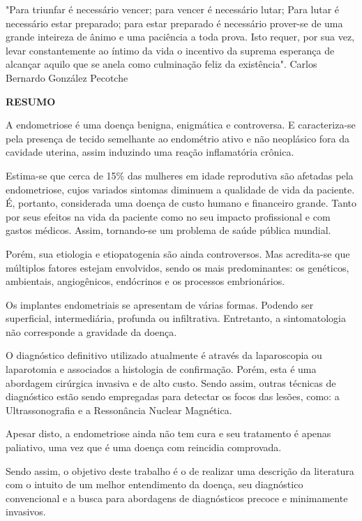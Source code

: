 \documentclass[12pt]{article} %
\begin{document}
"Para triunfar é necessário vencer; para vencer é necessário lutar;
Para lutar é necessário estar preparado; para estar preparado é necessário prover-se de uma grande inteireza de ânimo e uma paciência a toda prova. Isto requer, por sua vez, levar constantemente ao íntimo da vida o incentivo da suprema esperança de alcançar aquilo que se anela como culminação feliz da existência".
Carlos Bernardo González Pecotche 




\newpage
\begin{center}
\MakeUppercase{\textbf{Resumo}}
\end{center}

A endometriose é uma doença benigna, enigmática e controversa. E
caracteriza-se pela presença de tecido semelhante ao endométrio ativo
e não neoplásico fora da cavidade uterina, assim induzindo uma reação
inflamatória crônica.

Estima-se que cerca de 15\% das mulheres em idade reprodutiva são
afetadas pela endometriose, cujos variados sintomas diminuem a
qualidade de vida da paciente. É, portanto, considerada uma doença de
custo humano e financeiro grande.  Tanto por seus efeitos na vida da
paciente como no seu impacto profissional e com gastos médicos.
Assim, tornando-se um problema de saúde pública mundial.

Porém, sua etiologia e etiopatogenia são ainda controversos. Mas
acredita-se que múltiplos fatores estejam envolvidos, sendo os mais
predominantes: os genéticos, ambientais, angiogênicos, endócrinos e
os processos embrionários.

Os implantes endometriais se apresentam de várias formas. Podendo ser
superficial, intermediária, profunda ou infiltrativa. Entretanto, a
sintomatologia não corresponde a gravidade da doença. 

O diagnóstico definitivo utilizado atualmente é através da
laparoscopia ou laparotomia e associados a histologia de
confirmação. Porém, esta é uma abordagem cirúrgica invasiva e de alto
custo. Sendo assim, outras técnicas de diagnóstico estão sendo
empregadas para detectar os focos das lesões, como: a Ultrassonografia
e a Ressonância Nuclear Magnética.

Apesar disto, a endometriose ainda não tem cura e seu tratamento é
apenas paliativo, uma vez que é uma doença com reincidia comprovada.

Sendo assim, o objetivo deste trabalho é o de realizar uma descrição
da literatura com o intuito de um melhor entendimento da doença, seu
diagnóstico convencional e a busca para abordagens de diagnósticos
precoce e minimamente invasivos.
\end{document}

